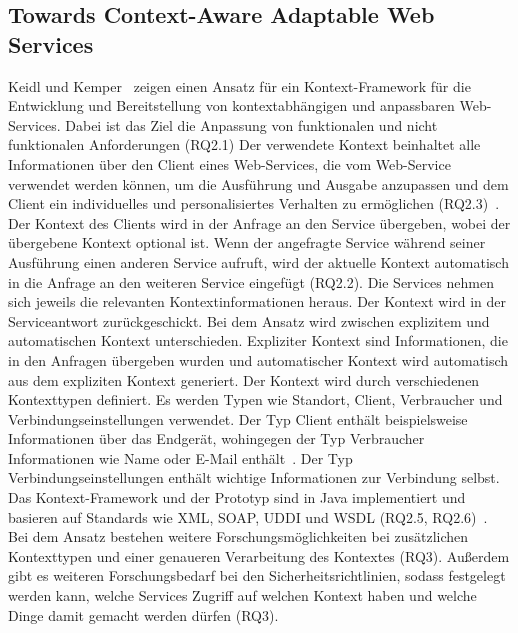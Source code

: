\documentclass[conference,compsoc,ngerman]{IEEEtran}
\begin{document}
\subsection{Towards Context-Aware Adaptable Web Services}
Keidl und Kemper~\cite{keidl2004towards} zeigen einen Ansatz für ein Kontext-Framework für die Entwicklung und Bereitstellung von kontextabhängigen und anpassbaren Web-Services. Dabei ist das Ziel die Anpassung von funktionalen und nicht funktionalen Anforderungen (RQ2.1)
Der verwendete Kontext beinhaltet alle Informationen über den Client eines Web-Services, die vom Web-Service verwendet werden können, um die Ausführung und Ausgabe anzupassen und dem Client ein individuelles und personalisiertes Verhalten zu ermöglichen (RQ2.3)~\cite{keidl2004towards}. Der Kontext des Clients wird in der Anfrage an den Service übergeben, wobei der übergebene Kontext optional ist. Wenn der angefragte Service während seiner Ausführung einen anderen Service aufruft, wird der aktuelle Kontext automatisch in die Anfrage an den weiteren Service eingefügt (RQ2.2). Die Services nehmen sich jeweils die relevanten Kontextinformationen heraus. Der Kontext wird in der Serviceantwort zurückgeschickt.
Bei dem Ansatz wird zwischen explizitem und automatischen Kontext unterschieden. Expliziter Kontext sind Informationen, die in den Anfragen übergeben wurden und automatischer Kontext wird automatisch aus dem expliziten Kontext generiert.
Der Kontext wird durch verschiedenen Kontexttypen definiert. Es werden Typen wie Standort, Client, Verbraucher und Verbindungseinstellungen verwendet. Der Typ Client enthält beispielsweise Informationen über das Endgerät, wohingegen der Typ Verbraucher Informationen wie Name oder E-Mail enthält~\cite{keidl2004towards}. Der Typ Verbindungseinstellungen enthält wichtige Informationen zur Verbindung selbst.
Das Kontext-Framework und der Prototyp sind in Java implementiert und basieren auf Standards wie XML, SOAP, UDDI und WSDL (RQ2.5, RQ2.6)~\cite{keidl2004towards}.
Bei dem Ansatz bestehen weitere Forschungsmöglichkeiten bei zusätzlichen Kontexttypen und einer genaueren Verarbeitung des Kontextes (RQ3). Außerdem gibt es weiteren Forschungsbedarf bei den Sicherheitsrichtlinien, sodass festgelegt werden kann, welche Services Zugriff auf welchen Kontext haben und welche Dinge damit gemacht werden dürfen (RQ3).
\end{document}
